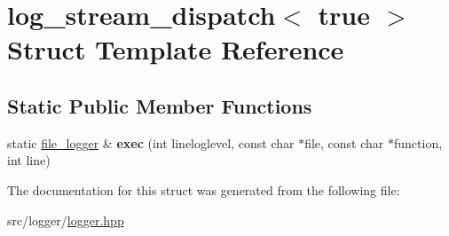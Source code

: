 \hypertarget{structlog__stream__dispatch_3_01true_01_4}{\section{log\-\_\-stream\-\_\-dispatch$<$ true $>$ Struct Template Reference}
\label{structlog__stream__dispatch_3_01true_01_4}
}
\subsection*{Static Public Member Functions}
\begin{DoxyCompactItemize}
\item 
\hypertarget{structlog__stream__dispatch_3_01true_01_4_a649cca69c67ae7348851dff62acd75b8}{static \hyperlink{classfile__logger}{file\-\_\-logger} \& {\bfseries exec} (int lineloglevel, const char $\ast$file, const char $\ast$function, int line)}\label{structlog__stream__dispatch_3_01true_01_4_a649cca69c67ae7348851dff62acd75b8}

\end{DoxyCompactItemize}


The documentation for this struct was generated from the following file\-:\begin{DoxyCompactItemize}
\item 
src/logger/\hyperlink{logger_8hpp}{logger.\-hpp}\end{DoxyCompactItemize}
